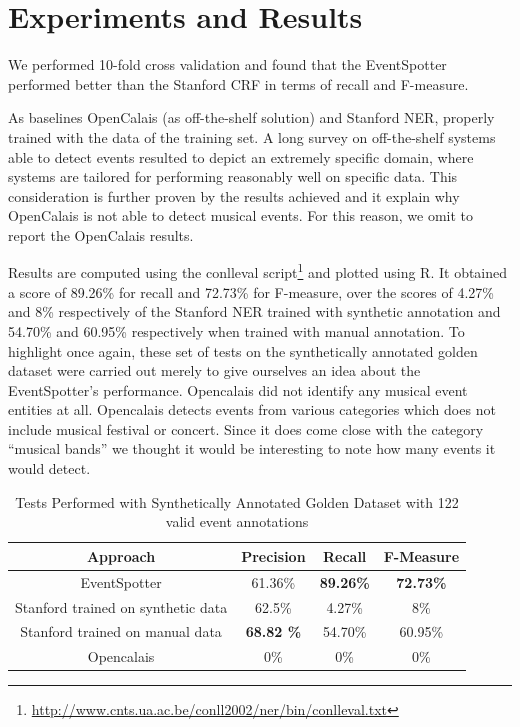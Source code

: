 \documentclass[10pt,a4paper]{article}
\begin{document}
{\color{red}{A+M:Details of the dataset (see how to explain the differences between synthetic and manual.}}

{\color{red}{A+M:create a table with the stats of the dataset, i.e. number of token etc. etc.}}

{\color{red}{A+M:point to the dataset (GitHub URI).}}

\section{Experiments and Results}
We performed 10-fold cross validation and found that the EventSpotter performed better than the Stanford CRF in terms of recall and F-measure.

As baselines OpenCalais (as off-the-shelf solution) and Stanford NER, properly trained with the data of the training set. A long survey on off-the-shelf systems able to detect events resulted to depict an extremely specific domain, where systems are tailored for performing reasonably well on specific data. This consideration is further proven by the results achieved and it explain why OpenCalais is not able to detect musical events. For this reason, we omit to report the OpenCalais results.

Results are computed using the conlleval script\footnote{\url{http://www.cnts.ua.ac.be/conll2002/ner/bin/conlleval.txt}} and plotted using R. It obtained a score of 89.26\% for recall and 72.73\% for F-measure, over the scores of 4.27\% and 8\% respectively of the Stanford NER trained with synthetic annotation and 54.70\% and 60.95\% respectively when trained with manual annotation. To highlight once again, these set of tests on the synthetically annotated golden dataset were carried out merely to give ourselves an idea about the EventSpotter's performance. Opencalais did not identify any musical event entities at all. Opencalais detects events from various categories which does not include musical festival or concert. Since it does come close with the category ``musical bands'' we thought it would be interesting to note how many events it would detect.
\begin{table}[ht]
\centering %
\begin{tabular}{c c c c} %
\hline\hline %
Approach & Precision & Recall & F-Measure \\ [0.5ex] %
\hline %
EventSpotter & 61.36\% & \bf 89.26\% \bf & \bf 72.73\% \bf \\ %
Stanford trained on synthetic data & 62.5\% & 4.27\% & 8\%\\
Stanford trained on manual data & \bf 68.82 \bf \% & 54.70\% & 60.95\% \\
Opencalais & 0\% & 0\% & 0\% \\
\hline %
\end{tabular}
\caption{Tests Performed with Synthetically Annotated Golden Dataset with 122 valid event annotations} %
\label{table:nonlin} %
\end{table}
\end{document}
